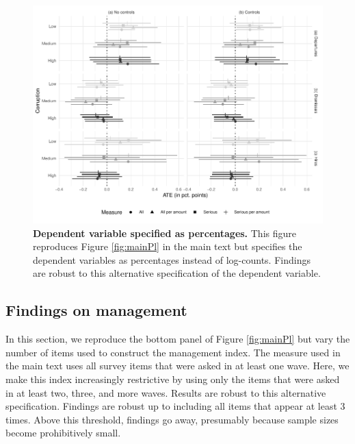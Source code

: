 {\begin{figure}[H]
    \centering
    \includegraphics{chapters/chapter_2/figures/plDv}
    \caption{{\bf Dependent variable specified as percentages.} This figure reproduces Figure \ref{fig:mainPl} in the main text but specifies the dependent variables as percentages instead of log-counts. Findings are robust to this alternative specification of the dependent variable.}
    \label{fig:plDv}
\end{figure}

\subsection{Findings on management}
\label{app:managementRobustness}

In this section, we reproduce the bottom panel of Figure \ref{fig:mainPl} but vary the number of items used to construct the management index. The measure used in the main text uses all survey items that were asked in at least one wave. Here, we make this index increasingly restrictive by using only the items that were asked in at least two, three, and more waves. Results are robust to this alternative specification. Findings are robust up to including all items that appear at least 3 times. Above this threshold, findings go away, presumably because sample sizes become prohibitively small.

}
